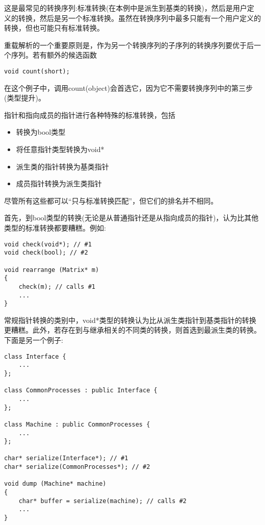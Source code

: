 这是最常见的转换序列:标准转换(在本例中是派生到基类的转换)，然后是用户定义的转换，然后是另一个标准转换。虽然在转换序列中最多只能有一个用户定义的转换，但也可能只有标准转换。

重载解析的一个重要原则是，作为另一个转换序列的子序列的转换序列要优于后一个序列。若有额外的候选函数

\begin{lstlisting}[style=styleCXX]
void count(short);
\end{lstlisting}

在这个例子中，调用count(object)会首选它，因为它不需要转换序列中的第三步(类型提升)。


指针和指向成员的指针进行各种特殊的标准转换，包括

\begin{itemize}
\item 
转换为bool类型

\item 
将任意指针类型转换为void*

\item 
派生类的指针转换为基类指针

\item 
成员指针转换为派生类指针
\end{itemize}

尽管所有这些都可以“只与标准转换匹配”，但它们的排名并不相同。

首先，到bool类型的转换(无论是从普通指针还是从指向成员的指针)，认为比其他类型的标准转换都要糟糕。例如:

\begin{lstlisting}[style=styleCXX]
void check(void*); // #1
void check(bool); // #2

void rearrange (Matrix* m)
{
	check(m); // calls #1
	...
}
\end{lstlisting}

常规指针转换的类别中，void*类型的转换认为比从派生类指针到基类指针的转换更糟糕。此外，若存在到与继承相关的不同类的转换，则首选到最派生类的转换。下面是另一个例子:

\begin{lstlisting}[style=styleCXX]
class Interface {
	...
};

class CommonProcesses : public Interface {
	...
};

class Machine : public CommonProcesses {
	...
};

char* serialize(Interface*); // #1
char* serialize(CommonProcesses*); // #2

void dump (Machine* machine)
{
	char* buffer = serialize(machine); // calls #2
	...
}
\end{lstlisting}

